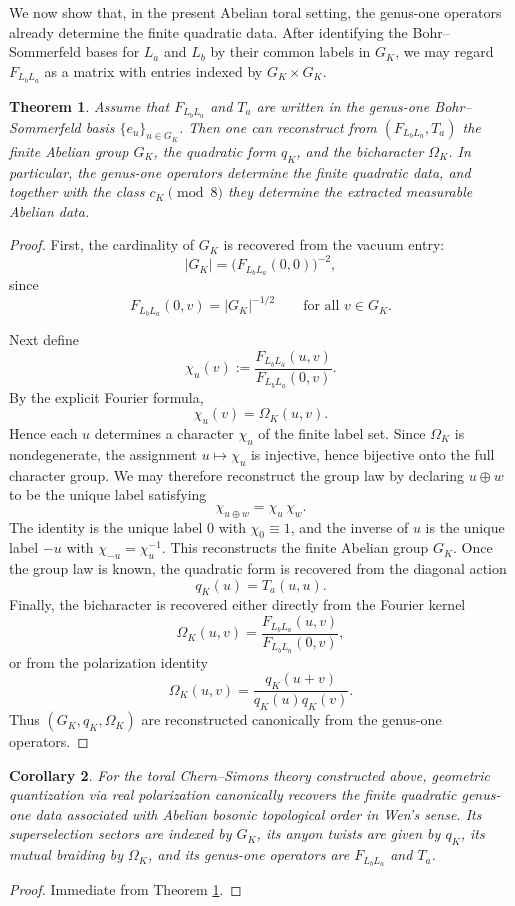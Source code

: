 \documentclass[12pt]{amsart}
\numberwithin{equation}{section}
\newtheorem{theorem}{Theorem}[section]
\newtheorem{corollary}[theorem]{Corollary}
\begin{document}
We now show that, in the present Abelian toral setting, the genus-one operators already
determine the finite quadratic data. After identifying the Bohr--Sommerfeld bases for
\(L_a\) and \(L_b\) by their common labels in \(G_K\), we may regard \(F_{L_bL_a}\) as a matrix
with entries indexed by \(G_K\times G_K\).

\begin{theorem}
\label{thm:reconstruct BS basis}
Assume that \(F_{L_bL_a}\) and \(T_a\) are written in the genus-one Bohr--Sommerfeld basis
\(\{e_u\}_{u\in G_K}\). Then one can reconstruct from \((F_{L_bL_a},T_a)\) the finite Abelian
group \(G_K\), the quadratic form \(q_K\), and the bicharacter \(\Omega_K\). In particular,
the genus-one operators determine the finite quadratic data, and together with the class \(c_K\pmod 8\) they determine the extracted measurable
Abelian data.
\end{theorem}
\begin{proof}
First, the cardinality of \(G_K\) is recovered from the vacuum entry:
\[
|G_K|=\bigl(F_{L_bL_a}(0,0)\bigr)^{-2},
\]
since
\[
F_{L_bL_a}(0,v)=|G_K|^{-1/2}
\qquad
\text{for all }v\in G_K.
\]

Next define
\[
\chi_u(v):=
\frac{F_{L_bL_a}(u,v)}{F_{L_bL_a}(0,v)}.
\]
By the explicit Fourier formula,
\[
\chi_u(v)=\Omega_K(u,v).
\]
Hence each \(u\) determines a character \(\chi_u\) of the finite label set. Since \(\Omega_K\)
is nondegenerate, the assignment $u\mapsto \chi_u$ is injective, hence bijective onto the full character group. We may therefore reconstruct the group law by declaring \(u\oplus w\) to be the unique
label satisfying
\[
\chi_{u\oplus w}=\chi_u\,\chi_w.
\]
The identity is the unique label \(0\) with \(\chi_0\equiv 1\), and the inverse of \(u\) is the
unique label \(-u\) with \(\chi_{-u}=\chi_u^{-1}\). This reconstructs the finite Abelian group
\(G_K\). Once the group law is known, the quadratic form is recovered from the diagonal action
\[
q_K(u)=T_a(u,u).
\]
Finally, the bicharacter is recovered either directly from the Fourier kernel
\[
\Omega_K(u,v)=\frac{F_{L_bL_a}(u,v)}{F_{L_bL_a}(0,v)},
\]
or from the polarization identity
\[
\Omega_K(u,v)=\frac{q_K(u+v)}{q_K(u)q_K(v)}.
\]
Thus \((G_K,q_K,\Omega_K)\) are reconstructed canonically from the genus-one operators.
\end{proof}

\begin{corollary}
For the toral Chern--Simons theory constructed above,  geometric
quantization via real polarization canonically recovers the finite quadratic genus-one data associated with
Abelian bosonic topological order in Wen's sense. Its superselection sectors are indexed by
\(G_K\), its anyon twists are given by \(q_K\), its mutual braiding by \(\Omega_K\), and its
genus-one operators are \(F_{L_bL_a}\) and \(T_a\).
\end{corollary}
\begin{proof}
Immediate from Theorem \ref{thm:reconstruct BS basis}.
\end{proof}
\end{document}
